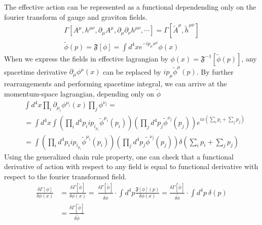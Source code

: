 \documentclass[11pt, a4paper]{article}
\begin{document}
The effective action can be represented as a functional dependending only on the fourier transform of gauge and graviton fields.
\begin{gather}
    \Gamma\left[ A^\mu, h^{\mu\nu}, \partial_\mu A^\mu, \partial_\mu \partial_\nu h^{\mu\nu}, \cdots\right] = \Gamma[ \tilde{A}^\mu, \tilde{h}^{\mu\nu}] \\
    \tilde{\phi}(p) = \mathfrak{F}[\phi] = \int d^4 x e^{-i p_\mu x^\mu} \phi(x)
\end{gather}
When we express the fields in effective lagrangian by $\phi(x) = \mathfrak{F}^{-1}[\tilde{\phi}(p)]$,
any spacetime derivative $\partial_\mu \phi^\mu(x)$ can be replaced by $i p_\mu \tilde{\phi}^\mu(p)$.
By further rearrangements and performing spacetime integral, we can arrive at the momentum-space lagrangian,
depending only on $\tilde{\phi}$
\begin{align}
    & \int d^4 x \prod_i \partial_{\mu_i} \phi^{\mu_i}(x) \prod_j \phi^{\nu_j} = \\
    & = \int d^4 x \int \left( \prod_i d^4 p_i i p_{i_{\mu_{i}}} \tilde{\phi}^{\mu_i}(p_i)\right)\left( \prod_j d^4 p_j \tilde{\phi}^{\nu_j}(p_j)\right) e^{i x \left(\sum_i p_i + \sum_j p_j \right)} \\
    & = \int \left( \prod_i d^4 p_i i p_{i_{\mu_{i}}} \tilde{\phi}^{\mu_i}(p_i)\right)\left( \prod_j d^4 p_j \tilde{\phi}^{\nu_j}(p_j)\right) \delta\left( \sum_i p_i + \sum_j p_j\right)
\end{align} %
Using the generalized chain rule property, one can check that a functional derivative of action with respect to any field is equal to functional derivative with respect to the fourier transformed field.
\begin{align}
    \frac{\delta \Gamma[\phi]}{\delta \phi (x)} & = \frac{\delta \Gamma[ \tilde{\phi}] }{\delta \phi(x)} = \ \frac{\delta \Gamma[ \tilde{\phi} ] }{\delta \tilde{\phi}} \cdot \int d^4 p \frac{\mathfrak{F}[\phi](p)}{\delta \phi(x)} = \frac{\delta \Gamma[ \tilde{\phi} ] }{\delta \tilde{\phi}} \cdot \int d^4 p \ \delta(p) \\
    & = \frac{\delta \Gamma[ \tilde{\phi} ] }{\delta \tilde{\phi}}
\end{align}

\end{document}
